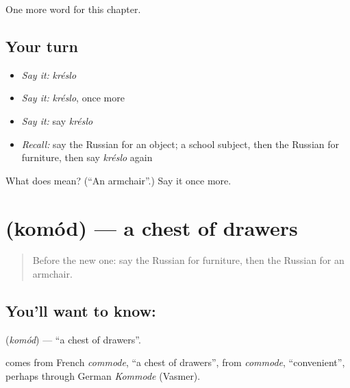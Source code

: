 \begin{grammarlens}[title={What you've built}]
One more word for this chapter.
\end{grammarlens}

\subsection*{Your turn}
\begin{itemize}
\raggedright
  \item \emph{Say it:} \emph{kréslo}
  \item \emph{Say it:} \emph{kréslo}, once more
  \item \emph{Say it:} say \emph{kréslo}
  \item \emph{Recall:} say the Russian for an object; a school subject, then the Russian for furniture, then say \emph{kréslo} again
\end{itemize}

\begin{tcolorbox}[breakable,colback=teal!4,colframe=teal!35!black,title={Before you move on}]
What does  mean? (\textquotedblleft{}An armchair\textquotedblright{}.) Say it once more.
\end{tcolorbox}
\section[\texorpdfstring{\ru{комод} (komód)}{комод (komód)}]{ (komód) — a chest of drawers}

\label{lesson:RU-C159-komod}



\begin{quote}
Before the new one: say the Russian for furniture, then the Russian for an armchair.
\end{quote}

\subsection*{You'll want to know: }
\textbf{} (\emph{komód}) — \textquotedblleft{}a chest of drawers\textquotedblright{}.

\begin{cousinweb}
\textbf{} comes from French \emph{commode}, \textquotedblleft{}a chest of drawers\textquotedblright{}, from \emph{commode}, \textquotedblleft{}convenient\textquotedblright{}, perhaps through German \emph{Kommode} (Vasmer).
\end{cousinweb}

